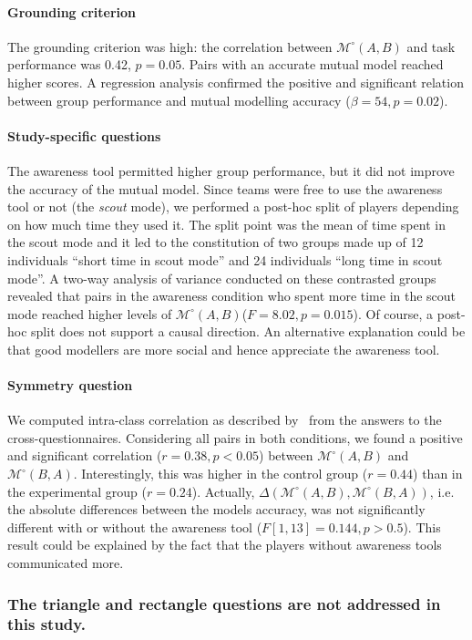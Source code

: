 \documentclass[natbib]{svjour3}
\newcommand{\ie}{i.e.\xspace}
\newcommand{\gModel}[2]{{$\mathcal{M}^{\circ}(#1, #2)$}}
\newcommand{\gMdeg}[2]{{\mathcal{M}^{\circ}(#1, #2)}}
\begin{document}
\paragraph{Grounding criterion} The grounding criterion was high: the
correlation between \gModel{A}{B} and task performance was 0.42, $p = 0.05$.
Pairs with an accurate mutual model reached higher scores. A regression analysis
confirmed the positive and significant relation between group performance and
mutual modelling accuracy ($\beta=54, p = 0.02$).

\paragraph{Study-specific questions} The awareness tool permitted higher group
performance, but it did not improve the accuracy of the mutual model. Since
teams were free to use the awareness tool or not (the \emph{scout} mode), we
performed a post-hoc split of players depending on how much time they used it.
The split point was the mean of time spent in the scout mode and it led to the
constitution of two groups made up of 12 individuals ``short time in scout
mode'' and 24 individuals ``long time in scout mode''. A two-way analysis of
variance conducted on these contrasted groups revealed that pairs in the
awareness condition who spent more time in the scout mode reached higher levels
of \gModel{A}{B}($F = 8.02, p = 0.015$). Of course, a post-hoc split
does not support a causal direction. An alternative explanation could be that
good modellers are more social and hence appreciate the awareness tool.

\paragraph{Symmetry question} We computed intra-class correlation as described
by~\citet{kenny1998data} from the answers to the cross-questionnaires.
Considering all pairs in both conditions, we found a positive and significant
correlation ($r = 0.38, p < 0.05$) between \gModel{A}{B} and \gModel{B}{A}.
Interestingly, this was higher in the control group ($r = 0.44$) than in the
experimental group ($r = 0.24$). Actually, $\Delta(\gMdeg{A}{B},\gMdeg{B}{A})$,
\ie the absolute differences between the models accuracy, was not significantly
different with or without the awareness tool ($F [1,13]= 0.144, p > 0.5$). This
result could be explained by the fact that the players without awareness tools
communicated more.

\subsubsection*{The triangle and rectangle questions are not addressed in this study.}
\end{document}
